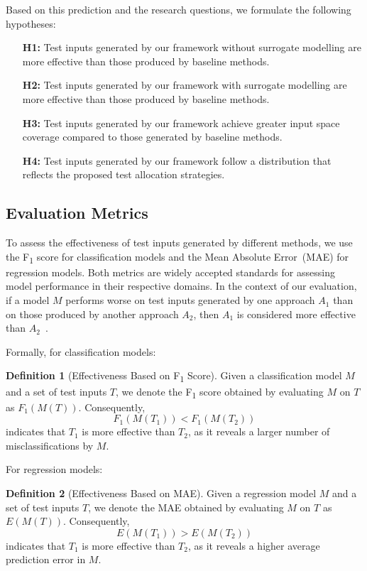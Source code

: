 \documentclass[
]{ceurart}
\theoremstyle{definition}
\newtheorem{definition}{Definition}[section]
\begin{document}
Based on this prediction and the research questions, we formulate the following hypotheses:
\begin{enumerate}[align=left]
  \item[\textbf{H1:}] Test inputs generated by our framework without surrogate modelling are more effective than those produced by baseline methods.
  \item[\textbf{H2:}] Test inputs generated by our framework with surrogate modelling are more effective than those produced by baseline methods.
  \item[\textbf{H3:}] Test inputs generated by our framework achieve greater input space coverage compared to those generated by baseline methods.
  \item[\textbf{H4:}] Test inputs generated by our framework follow a distribution that reflects the proposed test allocation strategies.
\end{enumerate}

\subsection{Evaluation Metrics}

To assess the effectiveness of test inputs generated by different methods, we use the F\textsubscript{1} score for classification models and the Mean Absolute Error~(MAE) for regression models. Both metrics are widely accepted standards for assessing model performance in their respective domains. In the context of our evaluation, if a model $M$ performs worse on test inputs generated by one approach $A_1$ than on those produced by another approach $A_2$, then $A_1$ is considered more effective than $A_2$~\cite{durelli}.

Formally, for classification models:
\begin{definition}[Effectiveness Based on F\textsubscript{1} Score]
\label{def:claeff}
Given a classification model $M$ and a set of test inputs $T$, we denote the F\textsubscript{1} score obtained by evaluating $M$ on $T$ as $F_1(M(T))$. Consequently,
\begin{equation*}
F_1(M(T_1)) < F_1(M(T_2))
\end{equation*}
indicates that $T_1$ is more effective than $T_2$, as it reveals a larger number of misclassifications by $M$.
\end{definition}

For regression models:
\begin{definition}[Effectiveness Based on MAE]
\label{def:regeff}
Given a regression model $M$ and a set of test inputs $T$, we denote the MAE obtained by evaluating $M$ on $T$ as $E(M(T))$. Consequently,
\begin{equation*}
E(M(T_1)) > E(M(T_2))
\end{equation*}
indicates that $T_1$ is more effective than $T_2$, as it reveals a higher average prediction error in $M$.
\end{definition}
\end{document}
